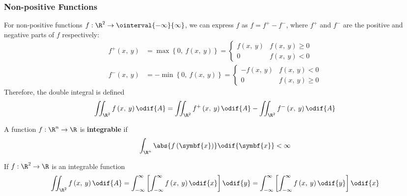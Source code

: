 \documentclass{article}
\begin{document}
\subsubsection{Non-positive Functions}
For non-positive functions \(f : \R^2 \to \ointerval{-\infty}{\infty}\),
we can express \(f\) as \(f = f^{+} - f^{-}\), where \(f^{+}\) and
\(f^{-}\) are the positive and negative parts of \(f\) respectively:
\begin{align*}
    f^{+}\left( x,\: y \right) & = \max{\left\{ 0,\: f\left( x,\: y \right) \right\}}
    =
    \begin{cases}
        f\left( x,\: y \right) & f\left( x,\: y \right) \geqslant 0 \\
        0                      & f\left( x,\: y \right) < 0
    \end{cases}
    \\
    f^{-}\left( x,\: y \right) & = -\min{\left\{ 0,\: f\left( x,\: y \right) \right\}}
    =
    \begin{cases}
        -f\left( x,\: y \right) & f\left( x,\: y \right) < 0         \\
        0                       & f\left( x,\: y \right) \geqslant 0
    \end{cases}
\end{align*}
Therefore, the double integral is defined
\begin{equation*}
    \iint_{\R^2} f\left( x,\: y \right) \odif{A} = \iint_{\R^2} f^{+}\left( x,\: y \right) \odif{A} - \iint_{\R^2} f^{-}\left( x,\: y \right) \odif{A}
\end{equation*}
\begin{definition}
    A function \(f : \R^n \to \R\) is \textbf{integrable} if
    \begin{equation*}
        \int_{\R^n} \abs{f\left( \symbf{x} \right)} \odif{\symbf{x}} < \infty
    \end{equation*}
\end{definition}
\begin{theorem}
    If \(f : \R^2 \to \R\) is an integrable function
    \begin{equation*}
        \iint_{\R^2} f\left( x,\: y \right) \odif{A} = \int_{-\infty}^\infty \left[ \int_{-\infty}^\infty f\left( x,\: y \right) \odif{x} \right] \odif{y} = \int_{-\infty}^\infty \left[ \int_{-\infty}^\infty f\left( x,\: y \right) \odif{y} \right] \odif{x}
    \end{equation*}
\end{theorem}
\end{document}
